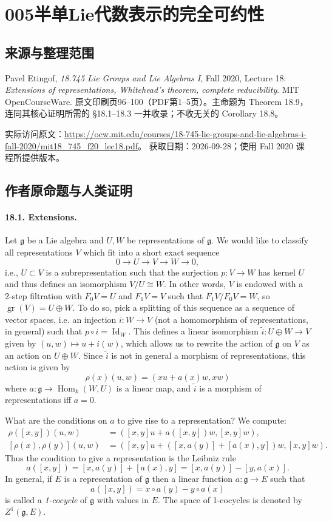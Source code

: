 \documentclass[UTF8,11pt]{ctexart}
\newcommand{\Hom}{\operatorname{Hom}}
\begin{document}
\section*{005\quad 半单Lie代数表示的完全可约性}
\subsection*{来源与整理范围}
Pavel Etingof, \emph{18.745 Lie Groups and Lie Algebras I}, Fall 2020, Lecture 18: \emph{Extensions of representations, Whitehead's theorem, complete reducibility}. MIT OpenCourseWare. 原文印刷页96--100（PDF第1--5页）。主命题为 Theorem 18.9，连同其核心证明所需的 \S18.1--18.3 一并收录；不收无关的 Corollary 18.8。

实际访问原文：\url{https://ocw.mit.edu/courses/18-745-lie-groups-and-lie-algebras-i-fall-2020/mit18_745_f20_lec18.pdf}。
获取日期：2026-09-28；使用 Fall 2020 课程所提供版本。

\subsection*{作者原命题与人类证明}
\paragraph{18.1. Extensions.}
Let $\mathfrak g$ be a Lie algebra and $U,W$ be representations of $\mathfrak g$. We would like to classify all representations $V$ which fit into a short exact sequence
\[
0\longrightarrow U\longrightarrow V\longrightarrow W\longrightarrow0,\tag{18.1}
\]
i.e., $U\subset V$ is a subrepresentation such that the surjection $p:V\to W$ has kernel $U$ and thus defines an isomorphism $V/U\cong W$. In other words, $V$ is endowed with a 2-step filtration with $F_0V=U$ and $F_1V=V$ such that $F_1V/F_0V=W$, so $\operatorname{gr}(V)=U\oplus W$. To do so, pick a splitting of this sequence as a sequence of vector spaces, i.e. an injection $i:W\to V$ (not a homomorphism of representations, in general) such that $p\circ i=\operatorname{Id}_W$. This defines a linear isomorphism $\widetilde i:U\oplus W\to V$ given by $(u,w)\mapsto u+i(w)$, which allows us to rewrite the action of $\mathfrak g$ on $V$ as an action on $U\oplus W$. Since $\widetilde i$ is not in general a morphism of representations, this action is given by
\[
\rho(x)(u,w)=(xu+a(x)w,xw)
\]
where $a:\mathfrak g\to\Hom_k(W,U)$ is a linear map, and $\widetilde i$ is a morphism of representations iff $a=0$.

What are the conditions on $a$ to give rise to a representation? We compute:
\[
\begin{aligned}
\rho([x,y])(u,w)&=([x,y]u+a([x,y])w,[x,y]w),\\
[\rho(x),\rho(y)](u,w)&=([x,y]u+([x,a(y)]+[a(x),y])w,[x,y]w).
\end{aligned}
\]
Thus the condition to give a representation is the Leibniz rule
\[
a([x,y])=[x,a(y)]+[a(x),y]=[x,a(y)]-[y,a(x)].
\]
In general, if $E$ is a representation of $\mathfrak g$ then a linear function $a:\mathfrak g\to E$ such that
\[
a([x,y])=x\circ a(y)-y\circ a(x)
\]
is called a \emph{1-cocycle} of $\mathfrak g$ with values in $E$. The space of 1-cocycles is denoted by $Z^1(\mathfrak g,E)$.
\end{document}
